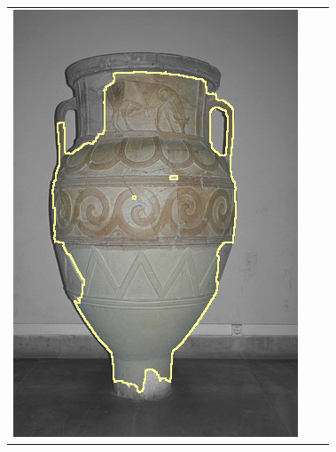 \documentclass[smallextended]{svjour3}       %
\begin{document}
{{\begin{figure}[ht!]
\begin{tabular}{ccc}
		\includegraphics[scale=0.2]{images/segmentation/bc/vase/gc-seg.png} &

\end{tabular}
\end{figure}}}
\end{document}
